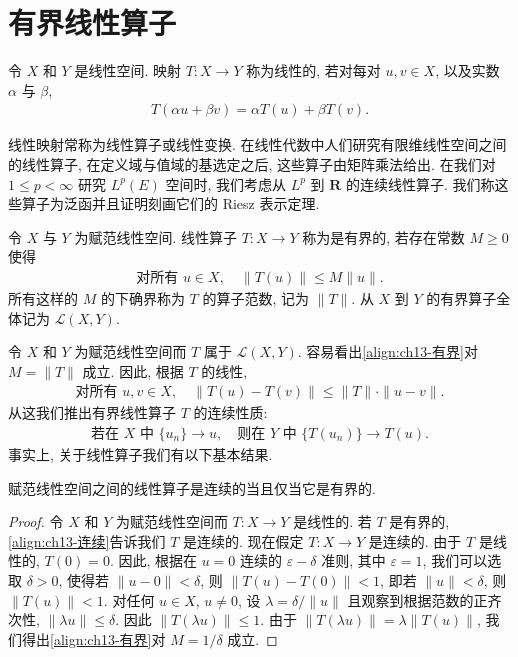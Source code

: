 \documentclass[../../main.tex]{subfiles}
\begin{document}
\section{有界线性算子}\label{section:ch13-有界线性算子}

\begin{definition}[线性算子]\label{definition:ch13-线性算子}
令 $X$ 和 $Y$ 是线性空间. 映射 $T:X\to Y$ 称为线性的, 若对每对 $u,v\in X$, 以及实数 $\alpha$ 与 $\beta$,
\begin{align*}
T(\alpha u+\beta v)=\alpha T(u)+\beta T(v).
\end{align*}
\end{definition}

线性映射常称为线性算子或线性变换. 在线性代数中人们研究有限维线性空间之间的线性算子, 在定义域与值域的基选定之后, 这些算子由矩阵乘法给出. 在我们对 $1\leqslant p<\infty$ 研究 $L^{p}(E)$ 空间时, 我们考虑从 $L^{p}$ 到 $\mathbf{R}$ 的连续线性算子. 我们称这些算子为泛函并且证明刻画它们的 Riesz 表示定理.

\begin{definition}[有界算子]\label{definition:ch13-有界算子}
令 $X$ 与 $Y$ 为赋范线性空间. 线性算子 $T:X\to Y$ 称为是有界的, 若存在常数 $M\geqslant 0$ 使得
\begin{align}
\text{对所有 }u\in X,\quad\|T(u)\|\leqslant M\|u\|.\label{align:ch13-有界}
\end{align}
所有这样的 $M$ 的下确界称为 $T$ 的算子范数, 记为 $\|T\|$. 从 $X$ 到 $Y$ 的有界算子全体记为 $\mathcal{L}(X,Y)$.
\end{definition}

令 $X$ 和 $Y$ 为赋范线性空间而 $T$ 属于 $\mathcal{L}(X,Y)$. 容易看出\eqref{align:ch13-有界}对 $M=\|T\|$ 成立. 因此, 根据 $T$ 的线性,
\begin{align}
\text{对所有 }u,v\in X,\quad\|T(u)-T(v)\|\leqslant\|T\|\cdot\|u-v\|.\label{align:ch13-Lipschitz}
\end{align}
从这我们推出有界线性算子 $T$ 的连续性质:
\begin{align}
\text{若在 }X\text{ 中 }\{u_{n}\}\to u,\quad\text{则在 }Y\text{ 中 }\{T(u_{n})\}\to T(u).\label{align:ch13-连续}
\end{align}
事实上, 关于线性算子我们有以下基本结果.

\begin{theorem}\label{theorem:ch13-连续当且仅当有界}
赋范线性空间之间的线性算子是连续的当且仅当它是有界的.
\end{theorem}

\begin{proof}
令 $X$ 和 $Y$ 为赋范线性空间而 $T:X\to Y$ 是线性的. 若 $T$ 是有界的, \eqref{align:ch13-连续}告诉我们 $T$ 是连续的. 现在假定 $T:X\to Y$ 是连续的. 由于 $T$ 是线性的, $T(0)=0$. 因此, 根据在 $u=0$ 连续的 $\varepsilon-\delta$ 准则, 其中 $\varepsilon=1$, 我们可以选取 $\delta>0$, 使得若 $\|u-0\|<\delta$, 则 $\|T(u)-T(0)\|<1$, 即若 $\|u\|<\delta$, 则 $\|T(u)\|<1$. 对任何 $u\in X$, $u\neq 0$, 设 $\lambda=\delta/\|u\|$ 且观察到根据范数的正齐次性, $\|\lambda u\|\leqslant\delta$. 因此 $\|T(\lambda u)\|\leqslant 1$. 由于 $\|T(\lambda u)\|=\lambda\|T(u)\|$, 我们得出\eqref{align:ch13-有界}对 $M=1/\delta$ 成立.
\end{proof}
\end{document}
